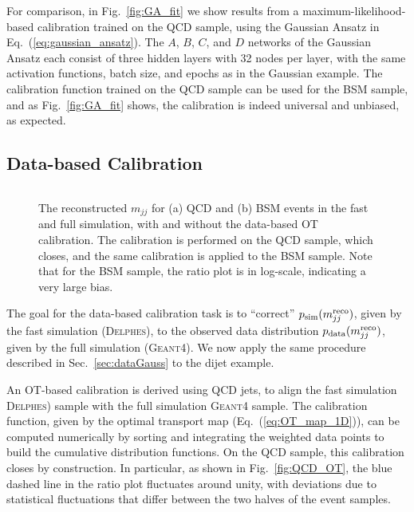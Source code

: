 \documentclass[aps,prd,reprint,preprintnumbers,superscriptaddress,nofootinbib,longbibliography,floatfix]{revtex4-1}
\DeclareRobustCommand{\Sec}[1]{Sec.~\ref{sec:#1}}
\DeclareRobustCommand{\Fig}[1]{Fig.~\ref{fig:#1}}
\DeclareRobustCommand{\Eq}[1]{Eq.~(\ref{eq:#1})}
\begin{document}
For comparison, in \Fig{GA_fit} we show results from a maximum-likelihood-based calibration trained on the QCD sample, using the Gaussian Ansatz in \Eq{gaussian_ansatz}.
%
The $A$, $B$, $C$, and $D$ networks of the Gaussian Ansatz each consist of three hidden layers with 32 nodes per layer, with the same activation functions, batch size, and epochs as in the Gaussian example.
%
The calibration function trained on the QCD sample can be used for the BSM sample, and as \Fig{GA_fit} shows, the calibration is indeed universal and unbiased, as expected.


\subsection{Data-based Calibration}

\begin{figure*}[t]
    \centering
    $\qquad$
    \caption{
    The reconstructed $m_{jj}$ for (a) QCD and (b) BSM events in the fast and full simulation, with and without the data-based OT calibration.
    The calibration is performed on the QCD sample, which closes, and the same calibration is applied to the BSM sample.
    Note that for the BSM sample, the ratio plot is in log-scale, indicating a very large bias.
    }
    \label{fig:dijet_OT}    
\end{figure*}


The goal for the data-based calibration task is to ``correct'' $p_{\rm sim}(m^{\text{reco}}_{jj})$, given by the fast simulation (\textsc{Delphes}), to the observed data distribution $p_{\rm data}(m^{\text{reco}}_{jj})$, given by the full simulation (\textsc{Geant4}).
%
We now apply the same procedure described in \Sec{dataGauss} to the dijet example.


An OT-based calibration is derived using QCD jets, to align the fast simulation \textsc{Delphes}) sample with the full simulation \textsc{Geant4} sample.
%
The calibration function, given by the optimal transport map (\Eq{OT_map_1D}), can be computed numerically by sorting and integrating the weighted data points to build the cumulative distribution functions.
%
On the QCD sample, this calibration closes by construction.
%
In particular, as shown in \Fig{QCD_OT}, the blue dashed line in the ratio plot fluctuates around unity, with deviations due to statistical fluctuations that differ between the two halves of the event samples.
\end{document}
